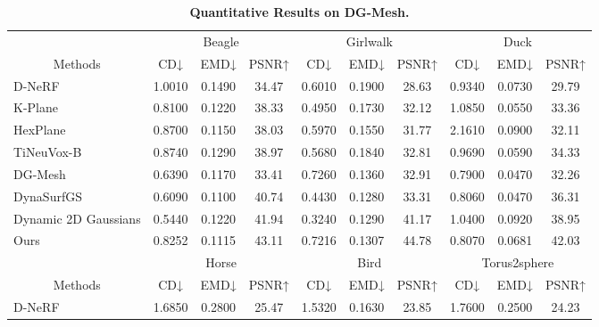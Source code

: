 \begin{table}[]
\centering
\caption{\textbf{Quantitative Results on DG-Mesh.}}
\label{tab:dgmesh_dataset_full2}
\begin{tabular}{@{}lccccccccc@{}}
\toprule
\multicolumn{1}{c}{} & \multicolumn{3}{c}{Beagle} & \multicolumn{3}{c}{Girlwalk} & \multicolumn{3}{c}{Duck} \\
\multicolumn{1}{c}{\multirow{-2}{*}{Methods}} & CD↓ & EMD↓ & PSNR↑ & CD↓ & EMD↓ & PSNR↑ & CD↓ & EMD↓ & PSNR↑ \\ \midrule
D-NeRF & 1.0010 & 0.1490 & 34.47 & 0.6010 & 0.1900 & 28.63 & 0.9340 & 0.0730 & 29.79 \\
K-Plane & 0.8100 & 0.1220 & 38.33 & \cellcolor[HTML]{FFFF8F}0.4950 & 0.1730 & 32.12 & 1.0850 & \cellcolor[HTML]{FFFF8F}0.0550 & 33.36 \\
HexPlane & 0.8700 & \cellcolor[HTML]{FFFF8F}0.1150 & 38.03 & 0.5970 & 0.1550 & 31.77 & 2.1610 & 0.0900 & 32.11 \\
TiNeuVox-B & 0.8740 & 0.1290 & 38.97 & 0.5680 & 0.1840 & 32.81 & 0.9690 & 0.0590 & 34.33 \\
DG-Mesh & \cellcolor[HTML]{FFFF8F}0.6390 & 0.1170 & 33.41 & 0.7260 & 0.1360 & 32.91 & \cellcolor[HTML]{F59194}0.7900 & \cellcolor[HTML]{F59194}0.0470 & 32.26 \\
DynaSurfGS & \cellcolor[HTML]{FAC791}0.6090 & \cellcolor[HTML]{F59194}0.1100 & \cellcolor[HTML]{FFFF8F}40.74 & \cellcolor[HTML]{FAC791}0.4430 & \cellcolor[HTML]{F59194}0.1280 & \cellcolor[HTML]{FFFF8F}33.31 & \cellcolor[HTML]{FAC791}0.8060 & \cellcolor[HTML]{F59194}0.0470 & \cellcolor[HTML]{FFFF8F}36.31 \\
Dynamic 2D Gaussians & \cellcolor[HTML]{F59194}0.5440 & 0.1220 & \cellcolor[HTML]{FAC791}41.94 & \cellcolor[HTML]{F59194}0.3240 & \cellcolor[HTML]{FAC791}0.1290 & \cellcolor[HTML]{FAC791}41.17 & 1.0400 & 0.0920 & \cellcolor[HTML]{FAC791}38.95 \\
Ours & 0.8252 & \cellcolor[HTML]{FAC791}0.1115 & \cellcolor[HTML]{F59194}43.11 & 0.7216 & \cellcolor[HTML]{FFFF8F}0.1307 & \cellcolor[HTML]{F59194}44.78 & \cellcolor[HTML]{FFFF8F}0.8070 & 0.0681 & \cellcolor[HTML]{F59194}42.03 \\ \midrule
\multicolumn{1}{c}{} & \multicolumn{3}{c}{Horse} & \multicolumn{3}{c}{Bird} & \multicolumn{3}{c}{Torus2sphere} \\
\multicolumn{1}{c}{\multirow{-2}{*}{Methods}} & CD↓ & EMD↓ & PSNR↑ & CD↓ & EMD↓ & PSNR↑ & CD↓ & EMD↓ & PSNR↑ \\ \midrule
D-NeRF & 1.6850 & 0.2800 & 25.47 & 1.5320 & 0.1630 & 23.85 & \cellcolor[HTML]{FFFF8F}1.7600 & 0.2500 & 24.23 \\

\end{tabular}
\end{table}
